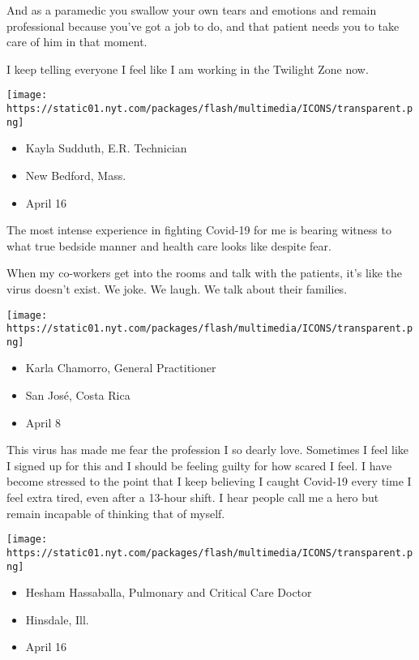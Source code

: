 And as a paramedic you swallow your own tears and emotions and remain
professional because you've got a job to do, and that patient needs you
to take care of him in that moment.

I keep telling everyone I feel like I am working in the Twilight Zone
now.

\texttt{[image: https://static01.nyt.com/packages/flash/multimedia/ICONS/transparent.png]}

\begin{itemize}
\tightlist
\item
  Kayla Sudduth, E.R. Technician
\item
  New Bedford, Mass.
\item
  April 16
\end{itemize}

The most intense experience in fighting Covid-19 for me is bearing
witness to what true bedside manner and health care looks like despite
fear.

When my co-workers get into the rooms and talk with the patients, it's
like the virus doesn't exist. We joke. We laugh. We talk about their
families.

\texttt{[image: https://static01.nyt.com/packages/flash/multimedia/ICONS/transparent.png]}

\begin{itemize}
\tightlist
\item
  Karla Chamorro, General Practitioner
\item
  San José, Costa Rica
\item
  April 8
\end{itemize}

This virus has made me fear the profession I so dearly love. Sometimes I
feel like I signed up for this and I should be feeling guilty for how
scared I feel. I have become stressed to the point that I keep believing
I caught Covid-19 every time I feel extra tired, even after a 13-hour
shift. I hear people call me a hero but remain incapable of thinking
that of myself.

\texttt{[image: https://static01.nyt.com/packages/flash/multimedia/ICONS/transparent.png]}

\begin{itemize}
\tightlist
\item
  Hesham Hassaballa, Pulmonary and Critical Care Doctor
\item
  Hinsdale, Ill.
\item
  April 16
\end{itemize}

